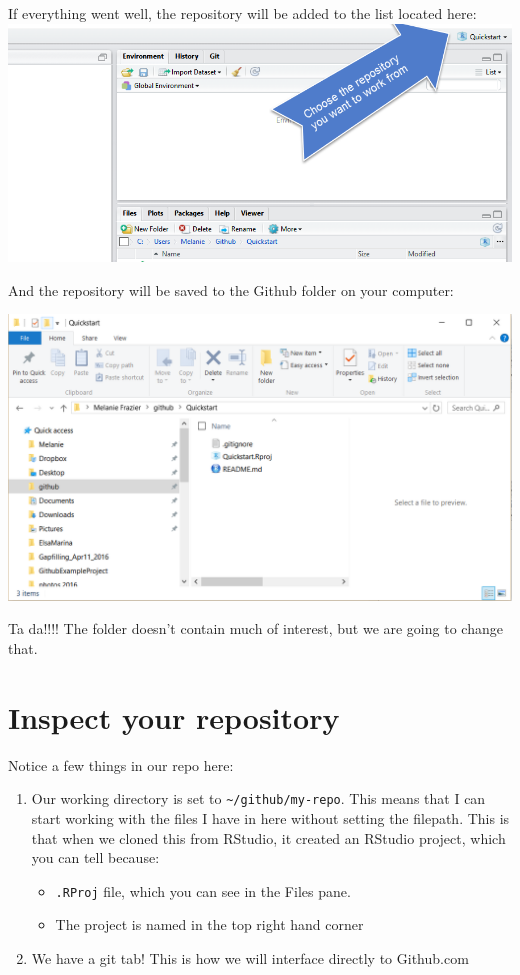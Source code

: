 \documentclass[]{book}
\providecommand{\tightlist}{%
  \setlength{\itemsep}{0pt}\setlength{\parskip}{0pt}}
\theoremstyle{definition}
\theoremstyle{definition}
\theoremstyle{definition}
\theoremstyle{remark}
\begin{document}
If everything went well, the repository will be added to the list
located here: \includegraphics{img/select_project.png}

And the repository will be saved to the Github folder on your computer:

\includegraphics{img/cloned_repository.png}

Ta da!!!! The folder doesn't contain much of interest, but we are going
to change that.

\section{Inspect your repository}\label{inspect-your-repository}

Notice a few things in our repo here:

\begin{enumerate}
\def\labelenumi{\arabic{enumi}.}
\tightlist
\item
  Our working directory is set to
  \texttt{\textasciitilde{}/github/my-repo}. This means that I can start
  working with the files I have in here without setting the filepath.
  This is that when we cloned this from RStudio, it created an RStudio
  project, which you can tell because:

  \begin{itemize}
  \tightlist
  \item
    \texttt{.RProj} file, which you can see in the Files pane.
  \item
    The project is named in the top right hand corner
  \end{itemize}
\item
  We have a git tab! This is how we will interface directly to
  Github.com
\end{enumerate}
\end{document}
